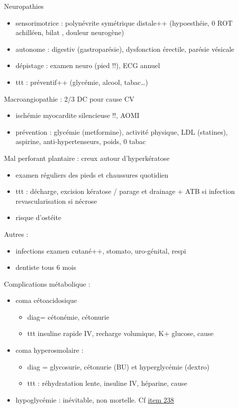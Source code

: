 \documentclass[11pt]{article}
\begin{document}
Neuropathies
\begin{itemize}
\item sensorimotrice : polynévrite symétrique distale++ (hypoesthéie, 0 ROT achilléen, bilat , douleur
neurogène)
\item autonome : digestiv (gastroparésie), dysfonction érectile, parésie vésicale
\item dépistage : examen neuro (pied !!), ECG annuel
\item ttt : préventif++ (glycémie, alcool, tabac\ldots{})
\end{itemize}
Macroangiopathie : 2/3 DC pour cause CV
\begin{itemize}
\item ischémie myocardite silencieuse !!, AOMI
\item prévention : glycémie (metformine), activité physique, LDL (statines),
aspirine, anti-hypertenseurs, poids, 0 tabac
\end{itemize}
Mal perforant plantaire : creux autour d'hyperkératose
\begin{itemize}
\item examen réguliers des pieds et chaussures quotidien
\item ttt : décharge, excision kératose / parage et drainage + ATB si infection \textpm{}
revascularisation si nécrose
\item risque d'ostéite
\end{itemize}
Autres : 
\begin{itemize}
\item infections \thus examen cutané++, stomato, uro-génital, respi
\item dentiste tous 6 mois
\end{itemize}
Complications métabolique :
\begin{itemize}
\item coma cétoacidosique 
\begin{itemize}
\item diag= cétonémie, cétonurie
\item ttt insuline rapide IV, recharge volumique, K+ \textpm{} glucose, cause
\end{itemize}
\item coma hyperosmolaire : 
\begin{itemize}
\item diag = glycosurie, cétonurie (BU) et hyperglycémie (dextro)
\item ttt : réhydratation lente, insuline IV, héparine, cause
\end{itemize}
\item hypoglycémie : inévitable, non mortelle. Cf \hyperref[sec:org4f1453b]{item 238}
\end{itemize}
\end{document}
